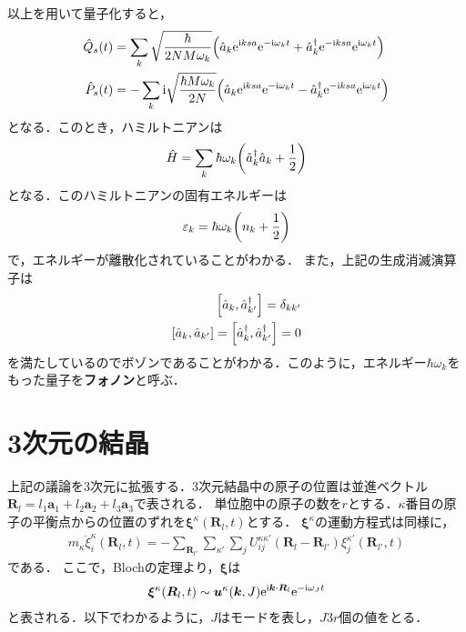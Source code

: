 \documentclass{report}
\begin{document}
以上を用いて量子化すると，
\begin{align}
  \hat{Q}_s(t) &= \sum_{k} \sqrt{\frac{\hbar}{2NM\omega_k}} \qty(\hat{a}_k \mathrm{e}^{\mathrm{i} ksa} \mathrm{e}^{-\mathrm{i}\omega_k t} + \hat{a}_k^\dagger \mathrm{e}^{-\mathrm{i} ksa} \mathrm{e}^{\mathrm{i}\omega_k t})\\
  \hat{P}_s(t) &= -\sum_{k} \mathrm{i}\sqrt{\frac{\hbar M \omega_k}{2N}} \qty(\hat{a}_k \mathrm{e}^{\mathrm{i} ksa} \mathrm{e}^{-\mathrm{i}\omega_k t} - \hat{a}_k^\dagger \mathrm{e}^{-\mathrm{i} ksa} \mathrm{e}^{\mathrm{i}\omega_k t})
\end{align}
となる．このとき，ハミルトニアンは
\begin{align}
  \hat{H} = \sum_{k} \hbar \omega_k \qty(\hat{a}_k^\dagger \hat{a}_k + \frac{1}{2})
\end{align}
となる．このハミルトニアンの固有エネルギーは
\begin{align}
  \varepsilon_k = \hbar\omega_k \qty(n_k + \frac{1}{2})
\end{align}
で，エネルギーが離散化されていることがわかる．
また，上記の生成消滅演算子は
\begin{align}
  \qty[\hat{a}_k,\hat{a}_{k'}^\dagger] = \delta_{kk'}\\
  \qty[\hat{a}_k,\hat{a}_{k'}] = \qty[\hat{a}_k^\dagger,\hat{a}_{k'}^\dagger] = 0
\end{align}
を満たしているのでボゾンであることがわかる．このように，エネルギー$\hbar\omega_k$をもった量子を\textbf{フォノン}と呼ぶ．

\section{3次元の結晶}
上記の議論を3次元に拡張する．3次元結晶中の原子の位置は並進ベクトル$\bm{R}_l = l_1\bm{a}_1 + l_2\bm{a}_2 + l_3\bm{a}_3$で表される．
単位胞中の原子の数を$r$とする．$\kappa$番目の原子の平衡点からの位置のずれを$\bm{\xi}^{\kappa}(\bm{R}_l,t)$とする．
$\bm{\xi}^{\kappa}$の運動方程式は同様に，
\begin{align}
  m_{\kappa}\ddot{\xi}_i^{\kappa}(\bm{R}_l,t) = - \sum_{\bm{R}_{l'}} \sum_{\kappa'} \sum_{j} U_{ij}^{\kappa\kappa'}(\bm{R}_l - \bm{R}_{l'}){\xi_j^{\kappa'}}(\bm{R}_{l'},t) \label{eom-3d}
\end{align}
である．
ここで，Blochの定理より，$\bm{\xi}$は
\begin{align}
  \bm{\xi}^{\kappa}(\bm{R}_l,t) \sim \bm{u}^{\kappa} (\bm{k},J)\mathrm{e}^{\mathrm{i} \bm{k}\cdot\bm{R}_l} \mathrm{e}^{-\mathrm{i} \omega_J t} \label{bloch}
\end{align}
と表される．以下でわかるように，$J$はモードを表し，$J3r$個の値をとる．
\end{document}
